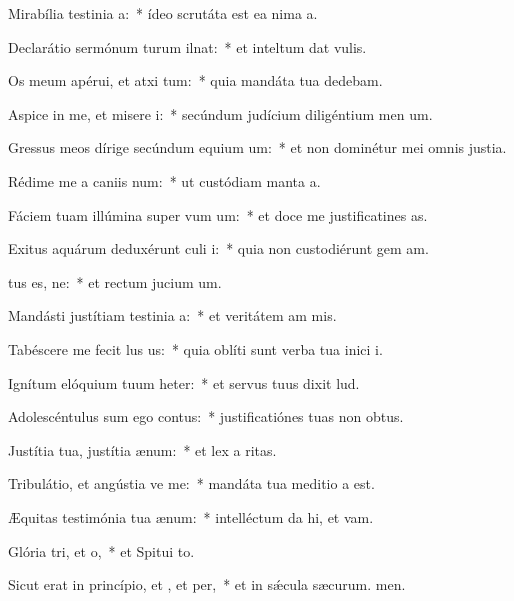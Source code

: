 \item Mirabília testinia a:~* ídeo scrutáta est ea nima a.
\item Declarátio sermónum turum ilnat:~* et inteltum dat vulis.
\item Os meum apérui, et atxi tum:~* quia mandáta tua dedebam.
\item Aspice in me, et misere i:~* secúndum judícium diligéntium men um.
\item Gressus meos dírige secúndum equium um:~* et non dominétur mei omnis justia.
\item Rédime me a caniis num:~* ut custódiam manta a.
\item Fáciem tuam illúmina super vum um:~* et doce me justificatines as.
\item Exitus aquárum deduxérunt culi i:~* quia non custodiérunt gem am.
\item {}tus es, ne:~* et rectum jucium um.
\item Mandásti justítiam testinia a:~* et veritátem am mis.
\item Tabéscere me fecit lus us:~* quia oblíti sunt verba tua inici i.
\item Ignítum elóquium tuum heter:~* et servus tuus dixit lud.
\item Adolescéntulus sum ego  contus:~* justificatiónes tuas non  obtus.
\item Justítia tua, justítia  ænum:~* et lex a ritas.
\item Tribulátio, et angústia ve me:~* mandáta tua meditio a est.
\item Æquitas testimónia tua  ænum:~* intelléctum da hi, et vam.
\item Glória tri, et o,~* et Spitui to.
\item Sicut erat in princípio, et , et per,~* et in sǽcula sæcurum. men.
